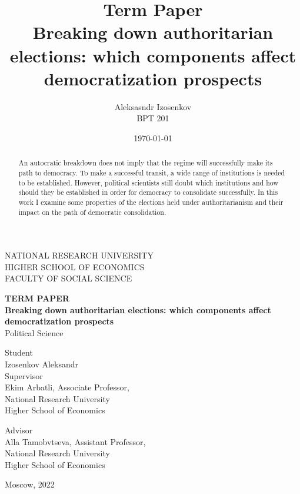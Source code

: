 \documentclass[a4paper, 12pt]{article}
\title{
Term Paper \\  Breaking down authoritarian elections: which components affect democratization prospects}
\author{Aleksasndr Izosenkov \\ BPT 201}
\date{\today}
\begin{document}
\doublespacing

\thispagestyle{empty} 

\begin{center}
NATIONAL RESEARCH UNIVERSITY
\\
HIGHER SCHOOL OF ECONOMICS
\\
FACULTY OF SOCIAL SCIENCE

\end{center}
\vspace{12ex}

\begin{center}
\textbf{TERM PAPER}\\
\vspace{2ex}
\textbf{Breaking down authoritarian elections: which components affect democratization prospects}\\
\vspace{2ex}
Political Science
\end{center}

\vspace{5ex}
\begin{flushright}
\hspace{40ex}
Student\\
Izosenkov Aleksandr \\

\vspace{5ex}
Supervisor\\
Ekim Arbatli, Associate Professor,\\ National Research University \\ Higher School of Economics

\vspace{5ex}
Advisor\\
Alla Tamobvtseva, Assistant Professor, \\National Research University\\ Higher School of Economics


\end{flushright}

\begin{center}
\vfill
Moscow, 2022
\end{center}

\newpage

\begin{abstract}
An autocratic breakdown does not imply that the regime will successfully make its path to democracy. To make a successful transit, a wide range of institutions is needed to be established. However, political scientists still doubt which institutions and how should they be established in order for democracy to consolidate successfully. In this work I examine some properties of the elections held under authoritarianism and their impact on the path of democratic consolidation. \end{abstract}
\end{document}
